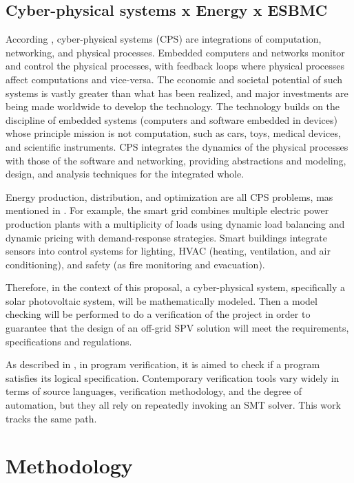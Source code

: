 \documentclass[journal]{IEEEtran}
\begin{document}
\subsection{Cyber-physical systems x Energy x ESBMC}
According \cite{UC}, cyber-physical systems (CPS) are integrations of computation, networking, and physical processes. Embedded computers and networks monitor and control the physical processes, with feedback loops where physical processes affect computations and vice-versa. The economic and societal potential of such systems is vastly greater than what has been realized, and major investments are being made worldwide to develop the technology. The technology builds on the discipline of embedded systems (computers and software embedded in devices) whose principle mission is not computation, such as cars, toys, medical devices, and scientific instruments. CPS integrates the dynamics of the physical processes with those of the software and networking, providing abstractions and modeling, design, and analysis techniques for the integrated whole. 

Energy production, distribution, and optimization are all CPS problems, mas mentioned in \cite{UC}. For example, the smart grid combines multiple electric power production plants with a multiplicity of loads using dynamic load balancing and dynamic pricing with demand-response strategies. Smart buildings integrate sensors into control systems for lighting, HVAC (heating, ventilation, and air conditioning), and safety (as fire monitoring and evacuation). 

Therefore, in the context of this proposal, a cyber-physical system, specifically a solar photovoltaic system, will be mathematically modeled. Then a model checking will be performed to do a verification of the project in order to guarantee that the design of an off-grid SPV solution will meet the requirements, specifications and regulations. 

As described in \cite{Alur}, in program verification, it is aimed to check if a program satisfies its logical specification. Contemporary verification tools vary widely in terms of source languages, verification methodology, and the degree of automation, but they all rely on repeatedly invoking an SMT solver. This work tracks the same path. 

\section{Methodology }
\end{document}
